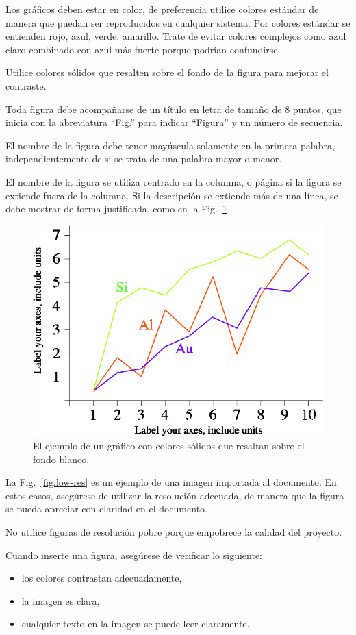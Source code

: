 ﻿\documentclass[10pt,twocolumn]{article}
\begin{document}
Los gráficos deben estar en color, de preferencia utilice colores estándar de manera que puedan ser reproducidos en cualquier sistema. Por colores estándar se entienden rojo, azul, verde, amarillo. Trate de evitar colores complejos como azul claro combinado con azul más fuerte porque podrían confundirse.

Utilice colores sólidos que resalten sobre el fondo de la figura para mejorar el contraste.

Toda figura debe acompañarse de un título en letra de tamaño de 8 puntos, que inicia con la abreviatura “Fig.” para indicar “Figura” y un número de secuencia.

El nombre de la figura debe tener mayúscula solamente en la primera palabra, independientemente de si se trata de una palabra mayor o menor.

El nombre de la figura se utiliza centrado en la columna, o página si la figura se extiende fuera de la columna. Si la descripción se extiende más de una línea, se debe mostrar de forma justificada, como en la Fig.~\ref{fig:solid-colors}.

\begin{figure}[t]
  \centering
  \includegraphics[width=0.75\columnwidth]{../img/image3.png}
  \caption{El ejemplo de un gráfico con colores sólidos que resaltan sobre el fondo blanco.}
  \label{fig:solid-colors}
\end{figure}

La Fig.~\ref{fig:low-res} es un ejemplo de una imagen importada al documento. En estos casos, asegúrese de utilizar la resolución adecuada, de manera que la figura se pueda apreciar con claridad en el documento.

No utilice figuras de resolución pobre porque empobrece la calidad del proyecto.

Cuando inserte una figura, asegúrese de verificar lo siguiente:
\begin{itemize}[leftmargin=*]
  \item los colores contrastan adecuadamente,
  \item la imagen es clara,
  \item cualquier texto en la imagen se puede leer claramente.
\end{itemize}
\end{document}
